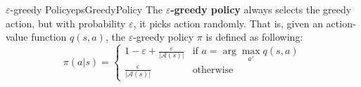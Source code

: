         \begin{defn}{$\varepsilon$-greedy Policy}{epsGreedyPolicy}
            The \textbf{$\varepsilon$-greedy policy} always selects the greedy action, but with probability $\varepsilon$, it picks action randomly. That is, given an action-value function $q(s,a)$,
            the $\varepsilon$-greedy policy $\pi$ is defined as following:
            \begin{equation}
                \pi(a|s) = \begin{cases}
                    1 - \varepsilon + \frac{\varepsilon}{|\mathcal{A}(s)|} &\text{if } a = \arg\max_{a'}{q(s,a)} \\
                    \frac{\varepsilon}{|\mathcal{A}(s)|} &\text{otherwise}
                \end{cases}
            \end{equation}
        \end{defn}